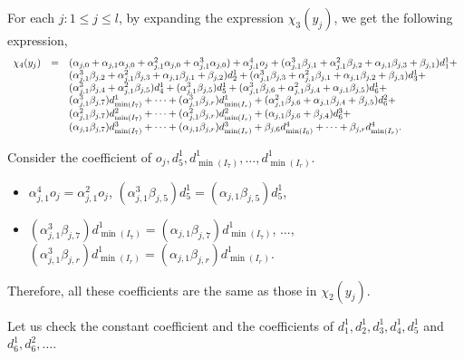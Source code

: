 For each $j: 1 \le j \le l$, 
by expanding the expression $\chi_3(y_j)$, we  get the following expression, 
\[
\begin{array}{l c l}
\chi_4(y_j) & = & (\alpha_{j,0} + \alpha_{j,1} \alpha_{j,0}+ \alpha^2_{j,1} \alpha_{j,0}+\alpha^3_{j,1} \alpha_{j,0}) + \alpha^4_{j,1}  o_j + (\alpha^3_{j,1} \beta_{j,1}+ \alpha^2_{j,1}\beta_{j,2} + \alpha_{j,1}\beta_{j,3} + \beta_{j,1}) d^1_1 + \\
& & (\alpha^3_{j,1} \beta_{j,2}+\alpha^2_{j,1}\beta_{j,3} + \alpha_{j,1}\beta_{j,1} + \beta_{j,2}) d^1_2 + (\alpha^3_{j,1} \beta_{j,3} + \alpha^2_{j,1}\beta_{j,1} + \alpha_{j,1}\beta_{j,2} +\beta_{j,3}) d^1_3 + \\
& & (\alpha^3_{j,1} \beta_{j,4}+\alpha^2_{j,1}\beta_{j,5}) d^1_4 + (\alpha^3_{j,1} \beta_{j,5}) d^1_5 + (\alpha^3_{j,1} \beta_{j,6}+\alpha^2_{j,1}\beta_{j,4}+\alpha_{j,1}\beta_{j,5})d^1_6 + \\
& & (\alpha^3_{j,1} \beta_{j,7}) d^1_{\min(I_7)}+ \dots + (\alpha^3_{j,1} \beta_{j,r}) d^1_{\min(I_r)} + 
 (\alpha^2_{j,1}\beta_{j,6}+\alpha_{j,1}\beta_{j,4} + \beta_{j,5}) d^2_{6} + \\
 & & (\alpha^2_{j,1}\beta_{j,7}) d^2_{\min(I_7)} + \dots + (\alpha^2_{j,1}\beta_{j,r}) d^2_{\min(I_r)}+  (\alpha_{j,1}\beta_{j,6}+\beta_{j,4}) d^3_{6} +  \\
 & & (\alpha_{j,1}\beta_{j,7}) d^3_{\min(I_7)} + \dots + (\alpha_{j,1}\beta_{j,r}) d^3_{\min(I_r)} + \beta_{j,6} d^4_{\min(I_6)} + \dots +  \beta_{j,r} d^4_{\min(I_r)}.
\end{array}
\] 

Consider the coefficient of $o_j, d^1_5, d^1_{\min(I_7)},\dots,d^1_{\min(I_r)}$.
\begin{itemize}
\item $\alpha^4_{j,1}o_j = \alpha^2_{j,1}o_j$, $(\alpha^3_{j,1} \beta_{j,5}) d^1_5 = (\alpha_{j,1} \beta_{j,5}) d^1_5$,
\item $(\alpha^3_{j,1} \beta_{j,7}) d^1_{\min(I_7)}= (\alpha_{j,1} \beta_{j,7}) d^1_{\min(I_7)}$, $\dots$, $(\alpha^3_{j,1} \beta_{j,r}) d^1_{\min(I_r)}= (\alpha_{j,1} \beta_{j,r}) d^1_{\min(I_r)}$.
\end{itemize}
Therefore, all these coefficients are the same as those in $\chi_2(y_j)$.

Let us check the constant coefficient and the coefficients of $d^1_1,d^1_2,d^1_3,d^1_4,d^1_5$ and $d^1_6,d^2_6,\dots$.

